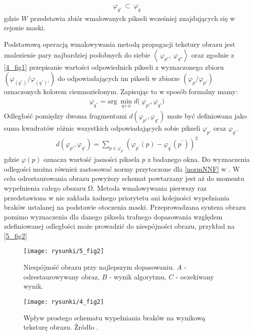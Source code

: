 \documentclass[12pt, twoside, openany]{report}
\theoremstyle{definition}
\begin{document}
\begin{align}
{\varphi }_{q'}\ \subset \ {\varphi }_q
\end{align}
gdzie $W$ przedstawia zbiór wmalowanych pikseli wcześniej znajdujących się w rejonie maski.
\par
Podstawową operacją wmalowywania metodą propagacji tekstury obrazu jest znalezienie pary najbardziej podobnych do siebie $\left\langle {\ \varphi }_{p'},\ {\varphi }_{q''}\right\rangle $ oraz zgodnie z \autoref{4_fig1} przepisanie wartości odpowiednich pikseli z wyznaczonego zbioru $({\varphi }_{(q^{''})}/{\varphi }_{(q^{''})'})$ do odpowiadających im pikseli w zbiorze $({\varphi }_p/{\varphi }_{p'})$ oznaczonych kolorem ciemnozielonym. Zapisując to w sposób formalny mamy:
\begin{align}
{\varphi }_{q^{''}}={\mathrm{arg}\ \mathop{\mathrm{min}}_{q\ \epsilon \mathrm{\ }\phi } d(\ }{\varphi }_{p'},{\varphi }_{q'})
\label{FROBDIST}
\end{align}
Odległość pomiędzy dwoma fragmentami $d({\varphi }_{p'},{\varphi }_{q'})$ może być definiowana jako suma kwadratów różnic wszystkich odpowiadających sobie pikseli ${\varphi }_{p'}$ oraz ${\varphi }_{q'}$.
\begin{align}
d(\varphi_{p'},\varphi_{q'})= \sum_{p\in \varphi_{p'}} \left( \varphi_{p^{'}}(p) - \varphi _{q^{'}} \left(p^{'}\right) \right)^2
\label{FROBENIUS2} 
\end{align}
gdzie $\varphi \left(p\right)$ oznacza wartość jasności piksela $p$ z badanego okna. Do wyznaczenia odlegości można również zastosować normy przytoczone dla \eqref{normNNF} w \cite{MathematicalModelsforNLTextureInpainting}. W celu odrestaurowania obrazu powyższy schemat powtarzany jest aż do momentu wypełnienia całego obszaru $\mathrm{\Omega }$.
Metoda wmalowywania pierwszy raz przedstawiona w  \cite{efros1999texture} nie zakłada żadnego priorytetu ani kolejności wypełniania braków ustalanej na podstawie otoczenia maski. Przeprowadzana synteza obrazu pomimo wyznaczenia dla danego piksela trafnego dopasowania względem zdefiniowanej odległości może prowadzić do niespójności obrazu, przykład na \autoref{5_fig2}
\begin{figure}[!h]
	\centering
	\texttt{[image: rysunki/5\_fig2]}
	\caption{Niespójność obrazu przy najlepszym dopasowaniu. $A$ - odrestaurowywany obraz, $B$ - wynik algorytmu, $C$ - oczekiwany wynik.}
	\label{5_fig2} 
\end{figure}
\par
\begin{figure}[!h]
	\centering
	\texttt{[image: rysunki/4\_fig2]}
	\caption{Wpływ prostego schematu wypełniania braków na wynikową teksturę obrazu. Źródło \cite{criminisi2004region}.}
	\label{4_fig2} 
\end{figure}
\end{document}

